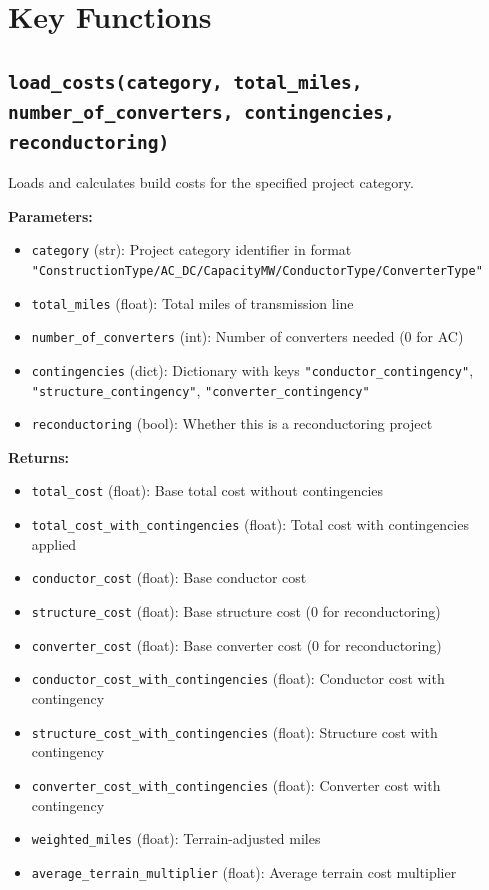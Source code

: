 \documentclass[12pt]{article}
\begin{document}
\section{Key Functions}

\subsection{\texttt{load\_costs(category, total\_miles, number\_of\_converters, contingencies, reconductoring)}}

Loads and calculates build costs for the specified project category.

\textbf{Parameters:}
\begin{itemize}
    \item \texttt{category} (str): Project category identifier in format \texttt{"ConstructionType/AC\_DC/CapacityMW/ConductorType/ConverterType"}
    \item \texttt{total\_miles} (float): Total miles of transmission line
    \item \texttt{number\_of\_converters} (int): Number of converters needed (0 for AC)
    \item \texttt{contingencies} (dict): Dictionary with keys \texttt{"conductor\_contingency"}, \texttt{"structure\_contingency"}, \texttt{"converter\_contingency"}
    \item \texttt{reconductoring} (bool): Whether this is a reconductoring project
\end{itemize}

\textbf{Returns:}
\begin{itemize}
    \item \texttt{total\_cost} (float): Base total cost without contingencies
    \item \texttt{total\_cost\_with\_contingencies} (float): Total cost with contingencies applied
    \item \texttt{conductor\_cost} (float): Base conductor cost
    \item \texttt{structure\_cost} (float): Base structure cost (0 for reconductoring)
    \item \texttt{converter\_cost} (float): Base converter cost (0 for reconductoring)
    \item \texttt{conductor\_cost\_with\_contingencies} (float): Conductor cost with contingency
    \item \texttt{structure\_cost\_with\_contingencies} (float): Structure cost with contingency
    \item \texttt{converter\_cost\_with\_contingencies} (float): Converter cost with contingency
    \item \texttt{weighted\_miles} (float): Terrain-adjusted miles
    \item \texttt{average\_terrain\_multiplier} (float): Average terrain cost multiplier
\end{itemize}
\end{document}
